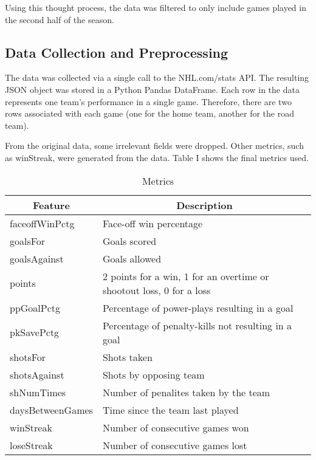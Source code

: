 \documentclass[letterpaper, 10 pt, conference]{ieeeconf}
\begin{document}
Using this thought process, the data was filtered to only include games played in the second half of the season.

\subsection{Data Collection and Preprocessing}

The data was collected via a single call to the NHL.com/stats API. The resulting JSON object was stored in a Python Pandas DataFrame. Each row in the data represents one team's performance in a single game. Therefore, there are two rows associated with each game (one for the home team, another for the road team).

From the original data, some irrelevant fields were dropped. Other metrics, such as winStreak, were generated from the data. Table I shows the final metrics used.


\begin{table}[h]
\centering
\caption{Metrics}
\begin{tabular}{p{2.5cm}p{4cm}}

\toprule
\multicolumn{1}{c}{\textbf{Feature}} & \multicolumn{1}{c}{\textbf{Description}}                             \\ \midrule
faceoffWinPctg                       & Face-off win percentage                                              \\
goalsFor                             & Goals scored                                                         \\
goalsAgainst                         & Goals allowed                                                        \\
points                               & 2 points for a win, 1 for an overtime or shootout loss, 0 for a loss \\
ppGoalPctg                           & Percentage of power-plays resulting in a goal                        \\
pkSavePctg                           & Percentage of penalty-kills not resulting in a goal                  \\
shotsFor                             & Shots taken                                                          \\
shotsAgainst                         & Shots by opposing team                                               \\
shNumTimes                           & Number of penalites taken by the team                                \\
daysBetweenGames                     & Time since the team last played                                      \\
winStreak                            & Number of consecutive games won                                      \\
loseStreak                           & Number of consecutive games lost                                     \\ \bottomrule
\end{tabular}
\end{table}
\end{document}
